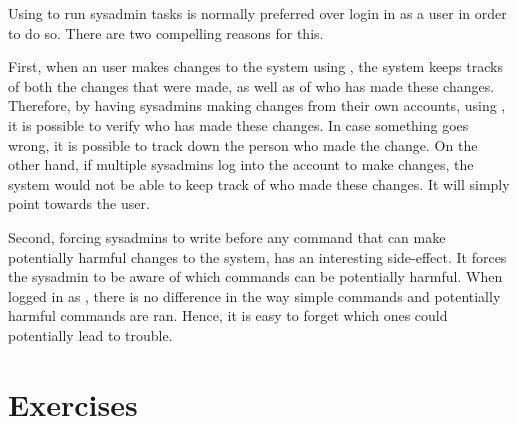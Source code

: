 \begin{my_box}
Using  to run sysadmin tasks is normally preferred over login  in as a  user in order to do so. There are two compelling reasons for this.

First, when an user makes changes to the system using , the system keeps tracks of both the changes that were made, as well as of who has made these changes. Therefore, by having sysadmins making changes from their own accounts, using , it is possible to verify who has made these changes. In case something goes wrong, it is possible to track down the person who made the change. On the other hand, if multiple sysadmins log into the  account to make changes, the system would not be able to keep track of who made these changes. It will simply point towards the  user.

Second, forcing sysadmins to write  before any command that can make potentially harmful changes to the system, has an interesting side-effect. It forces the sysadmin to be aware of which commands can be potentially harmful. When logged in as , there is no difference in the way simple commands and potentially harmful commands are ran. Hence, it is easy to forget which ones could potentially lead to trouble.
\end{my_box}


\section*{Exercises}


